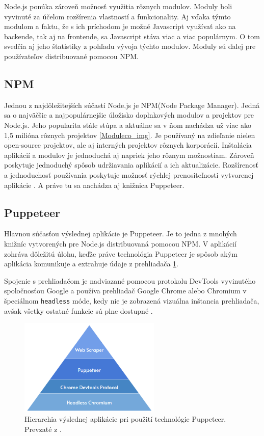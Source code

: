 \bigskip

Node.js ponúka zároveň možnosť využitia rôznych modulov. Moduly boli vyvinuté za účelom rozšírenia vlastností a funkcionality. Aj vďaka týmto modulom a faktu, že s ich príchodom je možné Javascript využívať ako na backende, tak aj na frontende, sa Javascript stáva viac a viac populárnym. O tom svedčia aj jeho štatistiky z pohľadu vývoja týchto modulov. Moduly sú ďalej pre používateľov distribuované pomocou NPM.

\subsection{NPM}

Jednou z najdôležitejších súčastí Node.js je NPM(Node Package Manager). Jedná sa o najväčšie a najpopulárnejšie úložisko doplnkových modulov a projektov pre Node.js. Jeho popularita stále stúpa a aktuálne sa v ňom nachádza už viac ako 1,5 milióna rôznych projektov \ref{Moduleco_img}. Je používaný na zdieľanie nielen open-source projektov, ale aj interných projektov rôznych korporácií. Inštalácia aplikácií a modulov je jednoduchá aj napriek jeho rôznym možnostiam. Zároveň poskytuje jednoduchý spôsob udržiavania aplikácií a ich aktualizácie. Rozšírenosť a jednoduchosť používania poskytuje možnosť rýchlej prenositeľnosti vytvorenej aplikácie \cite{npm}. A práve tu sa nachádza aj knižnica Puppeteer.

\newpage
\subsection{Puppeteer}

Hlavnou súčasťou výslednej aplikácie je Puppeteer. Je to jedna z mnohých knižníc vytvorených pre Node.js distribuovaná pomocou NPM. V aplikácií zohráva dôležitú úlohu, keďže práve technológia Puppeteer je spôsob akým aplikácia komunikuje a extrahuje údaje z prehliadača \ref{pupepyramid_img}. 

Spojenie s prehliadačom je nadviazané pomocou protokolu DevTools vyvinutého spoločnosťou Google a používa prehliadač Google Chrome alebo Chromium v špeciálnom \texttt{headless} móde, kedy nie je zobrazená vizuálna inštancia prehliadača, avšak všetky ostatné funkcie sú plne dostupné \cite{puppeteer}.  

\bigskip

\begin{figure}[hbt]
	\centering
	\includegraphics[width=0.6\textwidth]{obrazky-figures/pyramid.png}
	\caption{Hierarchia výslednej aplikácie pri použití technológie Puppeteer. Prevzaté z \cite{pyramid}.}
	\label{pupepyramid_img}
\end{figure}

